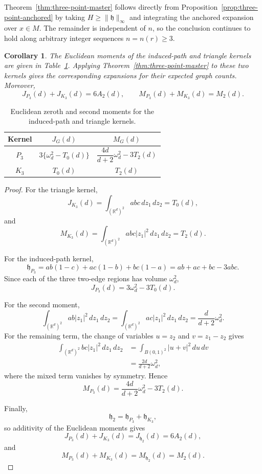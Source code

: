 \documentclass[11pt]{article}
\newtheorem{corollary}[theorem]{Corollary}
\theoremstyle{remark}
\newcommand{\R}{\mathbb R}
\numberwithin{equation}{section}
\begin{document}
Theorem~\ref{thm:three-point-master} follows directly from
Proposition~\ref{prop:three-point-anchored} by taking
\(H\ge\|\mathfrak h\|_\infty\) and integrating the anchored expansion over
\(x\in M\).  The remainder is independent of \(n\), so the conclusion
continues to hold along arbitrary integer sequences \(n=n(r)\ge3\).

\begin{corollary}
\label{cor:path-triangle}
The Euclidean moments of the induced-path and triangle kernels are given in
Table~\ref{tab:path-triangle-moments}.  Applying
Theorem~\ref{thm:three-point-master} to these two kernels gives the
corresponding expansions for their expected graph counts.  Moreover,
\[
J_{P_3}(d)+J_{K_3}(d)=6A_2(d),
\qquad
M_{P_3}(d)+M_{K_3}(d)=M_2(d).
\]
\end{corollary}

\begin{table}[htbp]
\centering
\caption{Euclidean zeroth and second moments for the induced-path and
triangle kernels.}
\label{tab:path-triangle-moments}
\renewcommand{\arraystretch}{1.35}
\begin{tabular}{@{}c c c@{}}
\toprule
Kernel & $J_G(d)$ & $M_G(d)$ \\
\midrule
$P_3$
& $3\{\omega_d^2-T_0(d)\}$
& $\dfrac{4d}{d+2}\omega_d^2-3T_2(d)$ \\[1.2ex]
$K_3$
& $T_0(d)$
& $T_2(d)$ \\
\bottomrule
\end{tabular}
\end{table}

\begin{proof}
For the triangle kernel,
\[
J_{K_3}(d)
=
\int_{(\R^d)^2}abc\,dz_1\,dz_2
=
T_0(d),
\]
and
\[
M_{K_3}(d)
=
\int_{(\R^d)^2}abc|z_1|^2\,dz_1\,dz_2
=
T_2(d).
\]

For the induced-path kernel,
\[
\mathfrak h_{P_3}
=
ab(1-c)+ac(1-b)+bc(1-a)
=
ab+ac+bc-3abc.
\]
Since each of the three two-edge regions has volume \(\omega_d^2\),
\[
J_{P_3}(d)
=
3\omega_d^2-3T_0(d).
\]

For the second moment,
\[
\int_{(\R^d)^2}ab|z_1|^2\,dz_1\,dz_2
=
\int_{(\R^d)^2}ac|z_1|^2\,dz_1\,dz_2
=
\frac{d}{d+2}\omega_d^2.
\]
For the remaining term, the change of variables
$u=z_2$ and $v=z_1-z_2$
gives
\[
\begin{aligned}
\int_{(\R^d)^2}bc|z_1|^2\,dz_1\,dz_2
&=
\int_{B(0,1)^2}|u+v|^2\,du\,dv\\
&=
\frac{2d}{d+2}\omega_d^2,
\end{aligned}
\]
where the mixed term vanishes by symmetry.  Hence
\[
M_{P_3}(d)
=
\frac{4d}{d+2}\omega_d^2-3T_2(d).
\]

Finally,
\[
\mathfrak h_2
=
\mathfrak h_{P_3}+\mathfrak h_{K_3},
\]
so additivity of the Euclidean moments gives
\[
J_{P_3}(d)+J_{K_3}(d)=J_{\mathfrak h_2}(d)=6A_2(d),
\]
and
\[
M_{P_3}(d)+M_{K_3}(d)=M_{\mathfrak h_2}(d)=M_2(d).
\]
\end{proof}
\end{document}
